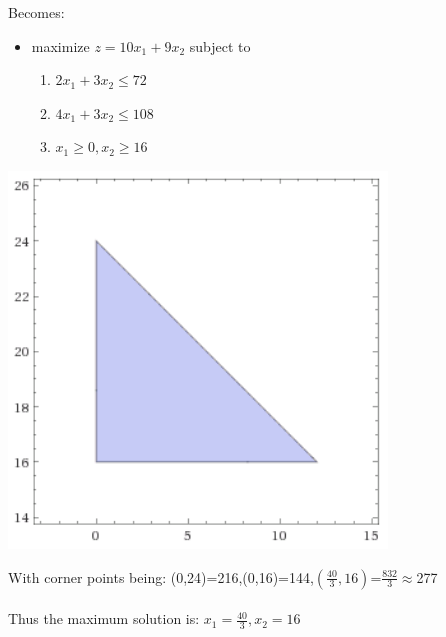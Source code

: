 \documentclass[11pt,a4paper,openany]{report}
\begin{document}
Becomes:
\begin{itemize}
  \item maximize \(z=10x_1+9x_2\) subject to
  \begin{enumerate}
    \item \(2x_1+3x_2\leq72\)
    \item \(4x_1+3x_2\leq108\)
    \item \(x_1\geq0,x_2\geq16\)
  \end{enumerate}
\end{itemize}
\begin{center}
  \includegraphics[height=10cm]{images/p2_1}
\end{center}
With corner points being: (0,24)=216,(0,16)=144,\((\frac{40}{3},16)\)=\(\frac{832}{3}\)$\approx$277\\\\
Thus the maximum solution is: \(x_1=\frac{40}{3},x_2=16\)

\newpage
\end{document}
